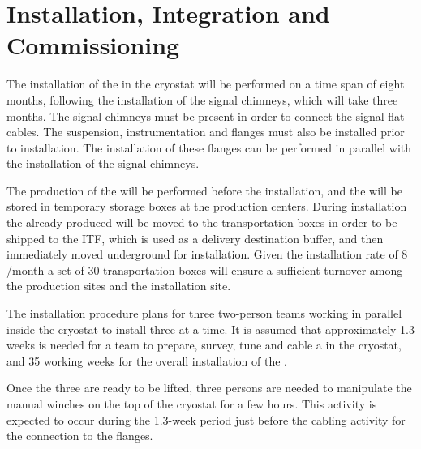\section{Installation, Integration and Commissioning}
\label{sec:fddp-crp-install}

The installation of the  in the cryostat will be performed on a time span of eight months, following the installation of the signal chimneys, which will take three months. The signal chimneys must be present in order to %
connect the  signal flat cables. The suspension, instrumentation and  flanges must also be  installed prior to  installation. The installation of these flanges can be performed in parallel with the installation of the signal chimneys. 

The production of the  will be performed before the installation, and the  will be stored in temporary storage boxes at the production centers. During installation the already produced  will be moved to the transportation boxes in order to be shipped to the ITF, which is used as a delivery destination buffer, and then immediately moved underground for installation. Given the installation rate of 8 /month a set of \num{30} transportation boxes will ensure a sufficient turnover among the production sites and the installation site.


The installation procedure %
plans for three two-person teams working in parallel inside the cryostat to %
install three  at a time. It is assumed that %
approximately \num{1.3} weeks is needed for a team to prepare, survey, tune and cable a  in the  cryostat, and \num{35} working weeks for the overall installation of the \dptotcrp {}.

Once the three  are ready to be lifted, three persons are needed to manipulate the manual winches on the top of the cryostat for a few hours. This activity is expected to occur during the \num{1.3}-week period just before the cabling activity for the connection to the flanges.

